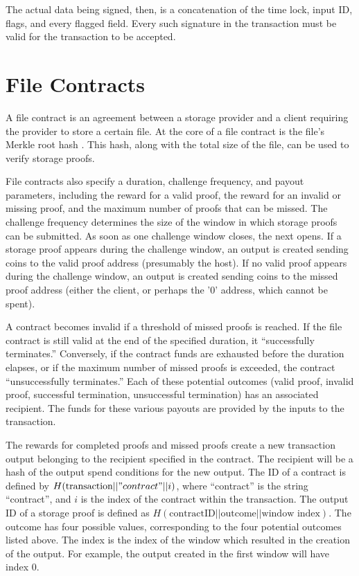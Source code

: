 \documentclass[twocolumn]{article}
\begin{document}
The actual data being signed, then, is a concatenation of the time lock, input ID, flags, and every flagged field.
Every such signature in the transaction must be valid for the transaction to be accepted.

\section{File Contracts}
\label{sec:contracts}
A file contract is an agreement between a storage provider and a client requiring the provider to store a certain file.
At the core of a file contract is the file's Merkle root hash \cite{merkle}.
This hash, along with the total size of the file, can be used to verify storage proofs.

File contracts also specify a duration, challenge frequency, and payout parameters, including the reward for a valid proof, the reward for an invalid or missing proof, and the maximum number of proofs that can be missed.
The challenge frequency determines the size of the window in which storage proofs can be submitted.
As soon as one challenge window closes, the next opens.
If a storage proof appears during the challenge window, an output is created sending coins to the valid proof address (presumably the host).
If no valid proof appears during the challenge window, an output is created sending coins to the missed proof address (either the client, or perhaps the '0' address, which cannot be spent).

A contract becomes invalid if a threshold of missed proofs is reached.
If the file contract is still valid at the end of the specified duration, it ``successfully terminates.''
Conversely, if the contract funds are exhausted before the duration elapses, or if the maximum number of missed proofs is exceeded, the contract ``unsuccessfully terminates.''
Each of these potential outcomes (valid proof, invalid proof, successful termination, unsuccessful termination) has an associated recipient.
The funds for these various payouts are provided by the inputs to the transaction.

The rewards for completed proofs and missed proofs create a new transaction output belonging to the recipient specified in the contract.
The recipient will be a hash of the output spend conditions for the new output.
The ID of a contract is defined by $H(\text{transaction} || "contract" || i)$, where ``contract'' is the string ``contract'', and $i$ is the index of the contract within the transaction.
The output ID of a storage proof is defined as $H(\text{contractID} || \text{outcome} || \text{window index})$.
The outcome has four possible values, corresponding to the four potential outcomes listed above.
The index is the index of the window which resulted in the creation of the output.
For example, the output created in the first window will have index 0.
\end{document}
